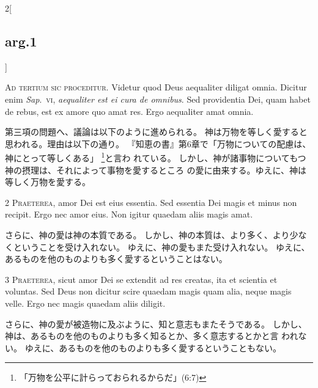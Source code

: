 \documentclass[paper=a4paper,fontsize=10pt,jafontsize=9pt,titlepage]{jlreq}
\begin{document}
\begin{paracol}{2}[\subsection{arg.1}]


{\Huge A}{\scshape d tertium sic proceditur}. Videtur quod
Deus aequaliter diligat omnia. Dicitur enim {\itshape Sap}.~{\scshape vi}, {\itshape aequaliter est ei
cura de omnibus}. Sed providentia Dei, quam habet de rebus, est ex amore
quo amat res. Ergo aequaliter amat omnia.

\switchcolumn

第三項の問題へ、議論は以下のように進められる。
神は万物を等しく愛すると思われる。理由は以下の通り。
『知恵の書』第6章で「万物についての配慮は、神にとって等しくある」
 \footnote{「万物を公平に計らっておられるからだ」(6:7)}と言わ
 れている。
しかし、神が諸事物についてもつ神の摂理は、それによって事物を愛するところ
 の愛に由来する。ゆえに、神は等しく万物を愛する。



{\scshape 2 Praeterea}, amor Dei est eius essentia. Sed
essentia Dei magis et minus non recipit. Ergo nec amor eius. Non igitur
quaedam aliis magis amat.

\switchcolumn

さらに、神の愛は神の本質である。
しかし、神の本質は、より多く、より少なくということを受け入れない。
ゆえに、神の愛もまた受け入れない。
ゆえに、あるものを他のものよりも多く愛するということはない。



{\scshape 3 Praeterea}, sicut amor Dei se extendit ad
res creatas, ita et scientia et voluntas. Sed Deus non dicitur scire
quaedam magis quam alia, neque magis velle. Ergo nec magis quaedam aliis
diligit.

\switchcolumn

さらに、神の愛が被造物に及ぶように、知と意志もまたそうである。
しかし、神は、あるものを他のものよりも多く知るとか、多く意志するとかと言
 われない。
ゆえに、あるものを他のものよりも多く愛するということもない。

\switchcolumn*[\subsection{s.c.}]



\end{paracol}
\end{document}
